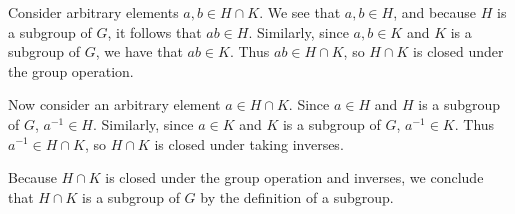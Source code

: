 \documentclass[11pt,letterpaper]{article}
\begin{document}
\begin{enumerate}
Consider arbitrary elements $a,b\in{H\cap{K}}$. We see that $a,b\in{H}$, and because $H$ is a subgroup of $G$, it follows that $ab\in{H}$. Similarly, since $a,b\in{K}$ and $K$ is a subgroup of $G$, we have that $ab\in{K}$. Thus $ab\in{H\cap{K}}$, so $H\cap{K}$ is closed under the group operation.

Now consider an arbitrary element $a\in{H\cap{K}}$. Since $a\in{H}$ and $H$ is a subgroup of $G$, $a^{-1}\in{H}$. Similarly, since $a\in{K}$ and $K$ is a subgroup of $G$, $a^{-1}\in{K}$. Thus $a^{-1}\in{H\cap{K}}$, so $H\cap{K}$ is closed under taking inverses.

Because $H\cap{K}$ is closed under the group operation and inverses, we conclude that $H\cap{K}$ is a subgroup of $G$ by the definition of a subgroup. \qedsymbol
\end{enumerate}
\end{document}
